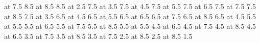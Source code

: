  at 7.5 8.5
 at 8.5 8.5
 at 2.5 7.5
 at 3.5 7.5
 at 4.5 7.5
 at 5.5 7.5
 at 6.5 7.5
 at 7.5 7.5
 at 8.5 7.5
 at 3.5 6.5
 at 4.5 6.5
 at 5.5 6.5
 at 6.5 6.5
 at 7.5 6.5
 at 8.5 6.5
 at 4.5 5.5
 at 5.5 5.5
 at 6.5 5.5
 at 7.5 5.5
 at 8.5 5.5
 at 5.5 4.5
 at 6.5 4.5
 at 7.5 4.5
 at 8.5 4.5
 at 6.5 3.5
 at 7.5 3.5
 at 8.5 3.5
 at 7.5 2.5
 at 8.5 2.5
 at 8.5 1.5
\endpicture
